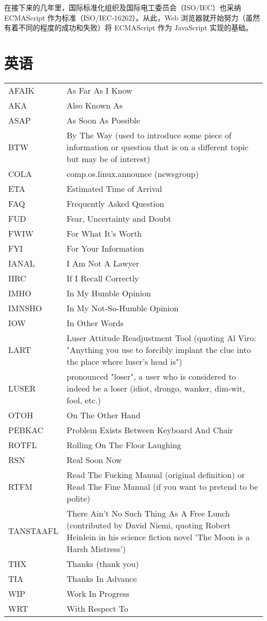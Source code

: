 \documentclass[a4paper,11pt]{book}
\begin{document}
在接下来的几年里，国际标准化组织及国际电工委员会（ISO/IEC）也采纳 ECMAScript 作为标准（ISO/IEC-16262）。从此，Web 浏览器就开始努力（虽然有着不同的程度的成功和失败）将 ECMAScript 作为 JavaScript 实现的基础。

\chapter{英语}
\begin{tabular}{ll}
AFAIK & As Far As I Know\\
AKA & Also Known As\\
ASAP & As Soon As Possible\\
BTW & By The Way (used to introduce some piece of information or question that is on a different topic but may be of interest)\\
COLA & comp.os.linux.announce (newsgroup)\\
ETA & Estimated Time of Arrival\\
FAQ & Frequently Asked Question\\
FUD & Fear, Uncertainty and Doubt\\
FWIW & For What It's Worth\\
FYI & For Your Information\\
IANAL & I Am Not A Lawyer\\
IIRC & If I Recall Correctly\\
IMHO & In My Humble Opinion\\
IMNSHO & In My Not-So-Humble Opinion\\
IOW & In Other Words\\
LART & Luser Attitude Readjustment Tool (quoting Al Viro: "Anything you use to forcibly implant the clue into the place where luser's head is")\\
LUSER & pronounced "loser", a user who is considered to indeed be a loser (idiot, drongo, wanker, dim-wit, fool, etc.)\\
OTOH & On The Other Hand\\
PEBKAC & Problem Exists Between Keyboard And Chair\\
ROTFL & Rolling On The Floor Laughing\\
RSN & Real Soon Now\\
RTFM & Read The Fucking Manual (original definition) or Read The Fine Manual (if you want to pretend to be polite)\\
TANSTAAFL & There Ain't No Such Thing As A Free Lunch (contributed by David Niemi, quoting Robert Heinlein in his science fiction novel 'The Moon is a Harsh Mistress')\\
THX & Thanks (thank you)\\
TIA & Thanks In Advance\\
WIP & Work In Progress\\
WRT & With Respect To\\
\end{tabular}


    
\end{document}
